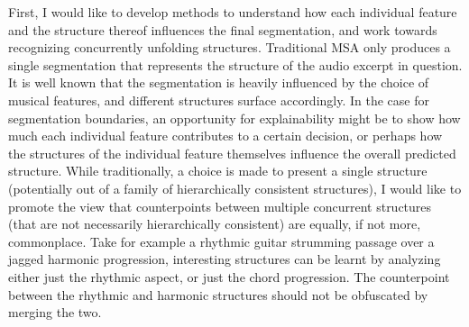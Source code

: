 First, I would like to develop methods to understand how each individual feature and the structure thereof influences the final segmentation, and work towards recognizing concurrently unfolding structures. 
Traditional MSA only produces a single segmentation that represents the structure of the audio excerpt in question. 
It is well known that the segmentation is heavily influenced by the choice of musical features, and different structures surface accordingly. 
In the case for segmentation boundaries, an opportunity for explainability might be to show how much each individual feature contributes to a certain decision, or perhaps how the structures of the individual feature themselves influence the overall predicted structure.
While traditionally, a choice is made to present a single structure (potentially out of a family of hierarchically consistent structures), I would like to promote the view that counterpoints between multiple concurrent structures (that are not necessarily hierarchically consistent) are equally, if not more, commonplace. 
Take for example a rhythmic guitar strumming passage over a jagged harmonic progression, interesting structures can be learnt by analyzing either just the rhythmic aspect, or just the chord progression. 
The counterpoint between the rhythmic and harmonic structures should not be obfuscated by merging the two.

